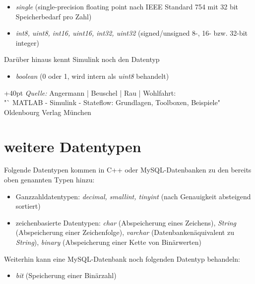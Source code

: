 \documentclass[fontsize = 12pt, paper = a4]{scrreprt}
\begin{document}
{\begin{itemize}
\item \textit{single} (single-precision floating point nach IEEE Standard 754 mit 32 bit Speicherbedarf pro Zahl)

\item \textit{int8, uint8, int16, uint16, int32, uint32} (signed/unsigned 8-, 16- bzw. 32-bit integer)

\end{itemize}

Darüber hinaus kennt Simulink noch den Datentyp

\begin{itemize}

\item \textit{boolean} (0 oder 1, wird intern als \textit{uint8} behandelt)

\end{itemize} 
\hangindent+40pt 
\textit{Quelle:} Angermann | Beuschel | Rau | Wohlfahrt: \\         "` MATLAB - Simulink - Stateflow: Grundlagen, Toolboxen, Beispiele"\ \\
Oldenbourg Verlag München


\section{weitere Datentypen}

Folgende Datentypen kommen in C++ oder MySQL-Datenbanken zu den bereits oben genannten Typen hinzu:

\begin{itemize}

\item Ganzzahldatentypen: \textit{decimal, smallint, tinyint} (nach Genauigkeit absteigend sortiert)

\item zeichenbasierte Datentypen: \textit{char} (Abspeicherung eines Zeichens), \textit{String} (Abspeicherung einer Zeichenfolge), \textit{varchar} (Datenbankenäquivalent zu \textit{String}), \textit{binary} (Abspeicherung einer Kette von Binärwerten)

\end{itemize}

Weiterhin kann eine MySQL-Datenbank noch folgenden Datentyp behandeln:

\begin{itemize}

\item \textit{bit} (Speicherung einer Binärzahl)


\end{itemize}}
\end{document}
